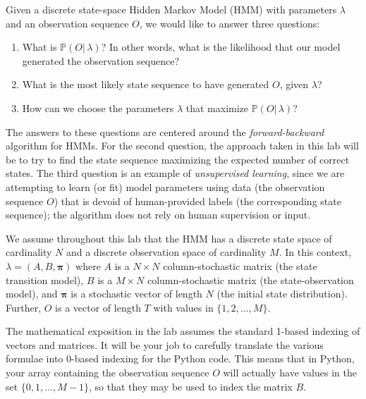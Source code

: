 \label{lab:hmm}

Given a discrete state-space Hidden Markov Model (HMM) with parameters $\lambda$ and an observation sequence $O$, we would like to answer three questions:
\begin{enumerate}
 \item What is $\mathbb{P}(O |\, \lambda)$? In other words, what is the likelihood that our model generated the observation sequence?
 \item What is the most likely state sequence to have generated $O$, given $\lambda$?
 \item How can we choose the parameters $\lambda$ that maximize $\mathbb{P}(O | \, \lambda)$?
\end{enumerate}
The answers to these questions are centered around the \emph{forward-backward} algorithm for HMMs.
For the second question, the approach taken in this lab will be to try to find the state sequence maximizing the expected number of correct states.
The third question is an example of \emph{unsupervised learning}, since we are attempting to learn (or fit) model parameters using data (the observation sequence $O$) that is devoid
of human-provided labels (the corresponding state sequence); the algorithm does not rely on human supervision or input.

We assume throughout this lab that the HMM has a discrete state space of cardinality $N$ and a discrete observation space of cardinality $M$.
In this context, $\lambda = \left( A, B, \mathbf{\pi} \right)$ where $A$ is a $N \times N$  column-stochastic matrix (the state transition model), $B$ is a $M \times N$ column-stochastic matrix (the
state-observation model), and $\mathbf{\pi}$ is a stochastic vector of length $N$ (the initial state distribution).
Further, $O$ is a vector of length $T$ with values in $\{1,2,\ldots,M\}$.

\begin{warn}
The mathematical exposition in the lab assumes the standard 1-based indexing of vectors and matrices.
It will be your job to carefully translate the various formulae into 0-based indexing for the Python code.
This means that in Python, your array containing the observation sequence $O$ will actually have values
in the set $\{0,1,\ldots,M-1\}$, so that they may be used to index the matrix $B$.
\end{warn}

